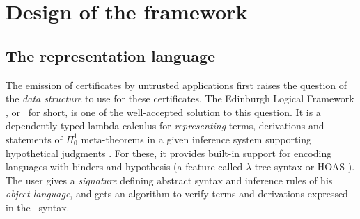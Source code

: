\documentclass{llncs}
\begin{document}

\section{Design of the framework}


\subsection{The representation language}
\label{sec:repr}

The emission of certificates by untrusted applications first raises
the question of the \emph{data structure} to use for these
certificates. %
The Edinburgh Logical Framework \cite{harper1993framework}, or \LF\
for short, is one of the well-accepted solution to this question. It
is a dependently typed lambda-calculus for \emph{representing} terms,
derivations and statements of $\Pi_0^1$ meta-theorems in a given
inference system supporting hypothetical judgments
\cite{pfenning2001logical}. For these, it provides built-in support
for encoding languages with binders and hypothesis (a feature called
$\lambda$-tree syntax or HOAS \cite{pfenning1988higher}). The user
gives a \emph{signature} defining abstract syntax and inference rules
of his \emph{object language}, and gets an algorithm to verify terms
and derivations expressed in the \LF\ syntax.
\end{document}
